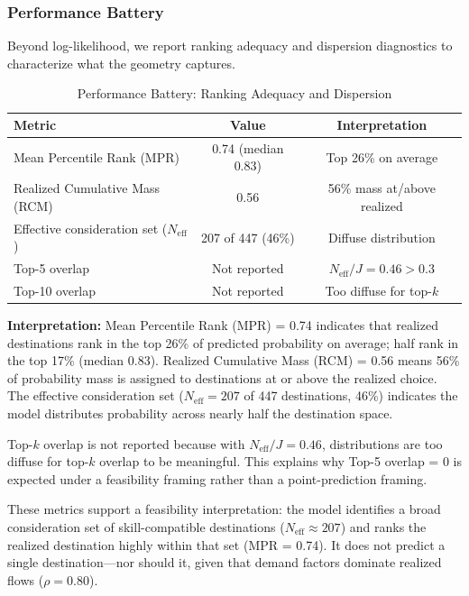 \documentclass[12pt]{article}
\begin{document}
\subsubsection{Performance Battery}
\label{subsubsec:performance-battery}


Beyond log-likelihood, we report ranking adequacy and dispersion diagnostics to characterize what the geometry captures.


\begin{table}[h!]
\centering
\caption{Performance Battery: Ranking Adequacy and Dispersion}
\label{tab:performance-battery}
\begin{tabular}{lcc}
\toprule
\textbf{Metric} & \textbf{Value} & \textbf{Interpretation} \\
\midrule
Mean Percentile Rank (MPR) & 0.74 (median 0.83) & Top 26\% on average \\
Realized Cumulative Mass (RCM) & 0.56 & 56\% mass at/above realized \\
Effective consideration set ($N_{\mathrm{eff}}$) & 207 of 447 (46\%) & Diffuse distribution \\
\midrule
Top-5 overlap & Not reported & $N_{\mathrm{eff}}/J = 0.46 > 0.3$ \\
Top-10 overlap & Not reported & Too diffuse for top-$k$ \\
\bottomrule
\end{tabular}
\end{table}


\textbf{Interpretation:} Mean Percentile Rank (MPR) = 0.74 indicates that realized destinations rank in the top 26\% of predicted probability on average; half rank in the top 17\% (median 0.83). Realized Cumulative Mass (RCM) = 0.56 means 56\% of probability mass is assigned to destinations at or above the realized choice. The effective consideration set ($N_{\mathrm{eff}} = 207$ of 447 destinations, 46\%) indicates the model distributes probability across nearly half the destination space.

Top-$k$ overlap is not reported because with $N_{\mathrm{eff}}/J = 0.46$, distributions are too diffuse for top-$k$ overlap to be meaningful. This explains why Top-5 overlap = 0 is expected under a feasibility framing rather than a point-prediction framing.

These metrics support a feasibility interpretation: the model identifies a broad consideration set of skill-compatible destinations ($N_{\mathrm{eff}} \approx 207$) and ranks the realized destination highly within that set (MPR = 0.74). It does not predict a single destination---nor should it, given that demand factors dominate realized flows ($\rho = 0.80$).
\end{document}
